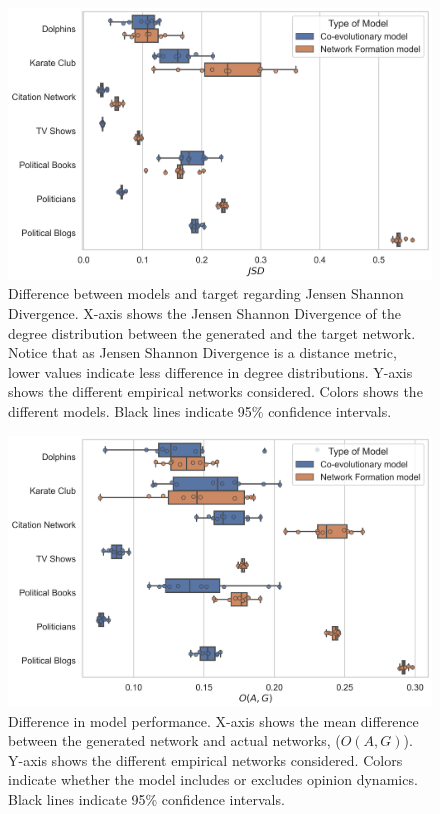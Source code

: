 \documentclass{article}
\begin{document}
\begin{figure}[H]
    \centering
    \includegraphics[width=.8\linewidth]{../plots/overall/Model_Evaluation_JSD.png}
  \caption{Difference between models and target regarding Jensen Shannon Divergence. X-axis shows the Jensen Shannon Divergence of the degree distribution between the generated and the target network. Notice that as Jensen Shannon Divergence is a distance metric, lower values indicate less difference in degree distributions. Y-axis shows the different empirical networks considered. Colors shows the different models. Black lines indicate 95\% confidence intervals.}
  \label{fig:eval_divergence}
\end{figure}

\begin{figure}[H]
    \centering
    \includegraphics[width=.8\linewidth]{../plots/overall/Model_Evaluation.png}
  \caption{Difference in model performance. X-axis shows the mean difference between the generated network and actual networks, ($O(A, G)$). Y-axis shows the different empirical networks considered. Colors indicate whether the model includes or excludes opinion dynamics. Black lines indicate 95\% confidence intervals.}
  \label{fig:eval_mean}
\end{figure}
\end{document}

